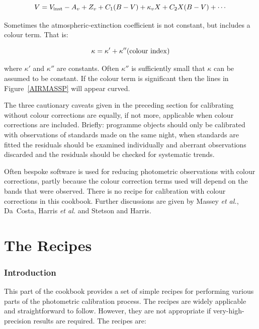 \documentclass[twoside,11pt,nolof]{starlink}
\begin{document}
\begin{equation}
V = V_{\rm inst} - A_{v} + Z_{v} + C_{1}(B-V) + \kappa_vX +
  C_{2}X(B-V) + \cdots
\end{equation}

Sometimes the atmospheric-extinction coefficient is not constant, but
includes a colour term.  That is:

\begin{equation}
\kappa = \kappa ' + \kappa '' ({\rm colour~index})
\end{equation}

where $\kappa '$ and $\kappa ''$ are constants.  Often $\kappa ''$ is
sufficiently small that $\kappa$ can be assumed to be constant.  If the
colour term is significant then the lines in Figure~\ref{AIRMASSP} will
appear curved.

The three cautionary caveats given in the preceding section for calibrating
without colour corrections are equally, if not more, applicable when colour
corrections are included.  Briefly: programme objects should only be
calibrated with observations of standards made on the same night, when
standards are fitted the residuals should be examined individually and
aberrant observations discarded and the residuals should be checked for
systematic trends.

Often bespoke software is used for reducing photometric observations with
colour corrections, partly because the colour correction terms used will
depend on the bands that were observed.  There is no recipe for
calibration with colour corrections in this cookbook.  Further
discussions are given by Massey \textit{et al.}\/\cite{MASSEY89},
Da~Costa\cite{DACOSTA90}, Harris \textit{et al.}\/\cite{HARRIS81} and
Stetson and Harris\cite{STETSON88}.


\cleardoublepage

\part{The Recipes}

\section{\label{INTRO_RECIP}Introduction}

This part of the cookbook provides a set of simple recipes for
performing various parts of the photometric calibration process.  The
recipes are widely applicable and straightforward to follow.  However,
they are not appropriate if very-high-precision results are required.
The recipes are:
\end{document}
